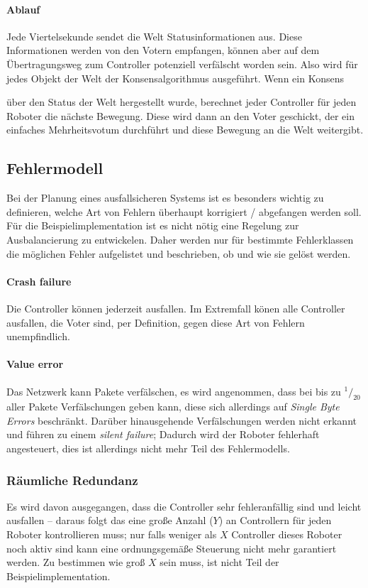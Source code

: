 \paragraph{Ablauf} Jede Viertelsekunde sendet die Welt Statusinformationen aus. Diese Informationen werden von den Votern empfangen, k{\"{o}}nnen
aber auf dem {\"{U}}bertragungsweg zum Controller potenziell verf{\"{a}}lscht worden sein. Also wird f{\"{u}}r jedes Objekt der Welt der Konsensalgorithmus
ausgef{\"{u}}hrt. Wenn ein Konsens {\"{u}ber den Status der Welt hergestellt wurde, berechnet 
jeder Controller f{\"{u}}r jeden Roboter die n{\"{a}}chste Bewegung. Diese wird dann an den Voter geschickt, der ein einfaches Mehrheitsvotum durchf{\"{u}}hrt und diese Bewegung an die Welt weitergibt.

\subsection{Fehlermodell} \label{error-model}
Bei der Planung eines ausfallsicheren Systems ist es besonders wichtig zu definieren, welche Art von Fehlern
{\"{u}}berhaupt korrigiert / abgefangen werden soll. F{\"{u}}r die Beispielimplementation ist es nicht
n{\"{o}}tig eine Regelung zur Ausbalancierung zu entwickelen. Daher werden nur f{\"{u}}r bestimmte Fehlerklassen
die m{\"{o}}glichen Fehler aufgelistet und beschrieben, ob und wie sie gel{\"{o}}st werden.

\paragraph{Crash failure} Die Controller k{\"{o}}nnen jederzeit ausfallen. Im Extremfall k{\"{o}}nen alle Controller ausfallen, die Voter sind, per Definition, gegen diese Art von Fehlern unempfindlich.

\paragraph{Value error} Das Netzwerk kann Pakete verf{\"{a}}lschen, es wird angenommen, dass bei bis zu
$^1/_{20}$ aller Pakete Verf{\"{a}}lschungen geben kann, diese sich allerdings auf
\textit{Single Byte Errors} beschr{\"{a}}nkt. Dar{\"{u}}ber hinausgehende Verf{\"{a}}lschungen werden nicht
erkannt und f{\"{u}}hren zu einem \textit{silent failure}; Dadurch wird der Roboter fehlerhaft angesteuert,
dies ist allerdings nicht mehr Teil des Fehlermodells.

\subsubsection{R{\"{a}}umliche Redundanz}
Es wird davon ausgegangen, dass die Controller sehr fehleranf{\"{a}}llig sind und leicht ausfallen --
daraus folgt das eine gro{\ss}e Anzahl ($Y$) an Controllern f{\"{u}}r jeden Roboter kontrollieren muss;
nur falls weniger als $X$ Controller dieses Roboter noch aktiv sind kann eine ordnungsgem{\"{a}}{\ss}e
Steuerung nicht mehr garantiert werden. Zu bestimmen wie gro{\ss} $X$ sein muss, ist nicht Teil der
Beispielimplementation.

}
